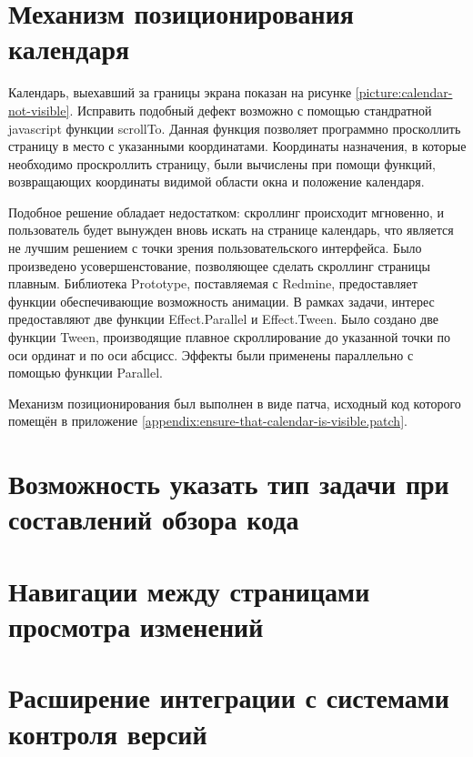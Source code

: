 \section{Механизм позиционирования календаря}
Календарь, выехавший за границы экрана показан на рисунке
\ref{picture:calendar-not-visible}. Исправить подобный дефект возможно с
помощью стандратной javascript функции scrollTo. Данная функция позволяет
программно просколлить страницу в место с указанными координатами. Координаты
назначения, в которые необходимо проскроллить страницу, были вычислены при
помощи функций, возвращающих координаты видимой области окна и положение
календаря.


Подобное решение обладает недостатком: скроллинг происходит мгновенно, и
пользователь будет вынужден вновь искать на странице календарь, что является не
лучшим решением с точки зрения пользовательского интерфейса. Было произведено
усовершенстование, позволяющее сделать скроллинг страницы плавным.
Библиотека Prototype, поставляемая с Redmine, предоставляет функции
обеспечивающие возможность анимации. В рамках задачи, интерес предоставляют две
функции Effect.Parallel и Effect.Tween. Было создано две функции Tween,
производящие плавное скроллирование до указанной точки по оси ординат и по оси
абсцисс. Эффекты были применены параллельно с помощью функции Parallel.

Механизм позиционирования был выполнен в виде патча, исходный код которого
помещён в приложение \ref{appendix:ensure-that-calendar-is-visible.patch}.


\section{Возможность указать тип задачи при составлений обзора кода}

\section{Навигации между страницами просмотра изменений}

\section{Расширение интеграции с системами контроля версий}









